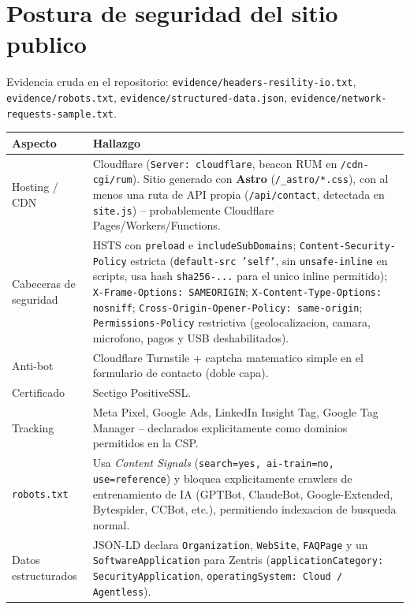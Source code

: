 \documentclass[11pt,a4paper]{article}
\begin{document}
\section{Postura de seguridad del sitio publico}

Evidencia cruda en el repositorio: \texttt{evidence/headers-resility-io.txt},
\texttt{evidence/robots.txt}, \texttt{evidence/structured-data.json},
\texttt{evidence/network-requests-sample.txt}.

\begin{longtable}{L{4cm}L{11cm}}
\toprule
\textbf{Aspecto} & \textbf{Hallazgo} \\
\midrule
\endhead
Hosting / CDN & Cloudflare (\texttt{Server: cloudflare}, beacon RUM en \texttt{/cdn-cgi/rum}).
Sitio generado con \textbf{Astro} (\texttt{/\_astro/*.css}), con al menos una ruta de API propia
(\texttt{/api/contact}, detectada en \texttt{site.js}) -- probablemente Cloudflare
Pages/Workers/Functions. \\
Cabeceras de seguridad & HSTS con \texttt{preload} e \texttt{includeSubDomains};
\texttt{Content-Security-Policy} estricta (\texttt{default-src 'self'}, sin
\texttt{unsafe-inline} en scripts, usa hash \texttt{sha256-...} para el unico inline permitido);
\texttt{X-Frame-Options: SAMEORIGIN}; \texttt{X-Content-Type-Options: nosniff};
\texttt{Cross-Origin-Opener-Policy: same-origin}; \texttt{Permissions-Policy} restrictiva
(geolocalizacion, camara, microfono, pagos y USB deshabilitados). \\
Anti-bot & Cloudflare Turnstile + captcha matematico simple en el formulario de contacto
(doble capa). \\
Certificado & Sectigo PositiveSSL. \\
Tracking & Meta Pixel, Google Ads, LinkedIn Insight Tag, Google Tag Manager -- declarados
explicitamente como dominios permitidos en la CSP. \\
\texttt{robots.txt} & Usa \emph{Content Signals} (\texttt{search=yes, ai-train=no,
use=reference}) y bloquea explicitamente crawlers de entrenamiento de IA (GPTBot, ClaudeBot,
Google-Extended, Bytespider, CCBot, etc.), permitiendo indexacion de busqueda normal. \\
Datos estructurados & JSON-LD declara \texttt{Organization}, \texttt{WebSite}, \texttt{FAQPage}
y un \texttt{SoftwareApplication} para Zentris (\texttt{applicationCategory:
SecurityApplication}, \texttt{operatingSystem: Cloud / Agentless}). \\
\bottomrule
\end{longtable}
\end{document}

